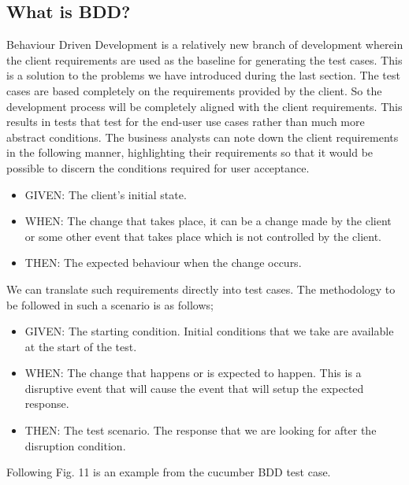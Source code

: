 \documentclass[conference, onecolumn, a4, 12pt]{IEEEtran}
\begin{document}
\subsection{What is BDD?}
Behaviour Driven Development is a relatively new branch of development wherein the client requirements are used as the baseline for generating the test cases. This is a solution to the problems we have introduced during the last section. The test cases are based completely on the requirements provided by the client. So the development process will be completely aligned with the client requirements. This results in tests that test for the end-user use cases rather than much more abstract conditions.\newline
The business analysts can note down the client requirements in the following manner, highlighting their requirements so that it would be possible to discern the conditions required for user acceptance.
\begin{itemize}
	\item GIVEN: The client's initial state.
	\item WHEN: The change that takes place, it can be a change made by the client or some other event that takes place which is not controlled by the client.
	\item THEN: The expected behaviour when the change occurs.
\end{itemize}
We can translate such requirements directly into test cases. The methodology to be followed in such a scenario is as follows;
\begin{itemize}
	\item GIVEN: The starting condition. Initial conditions that we take are available at the start of the test.
	\item WHEN: The change that happens or is expected to happen. This is a disruptive event that will cause the event that will setup the expected response.
	\item THEN: The test scenario. The response that we are looking for after the disruption condition.
\end{itemize}

Following Fig. 11 is an example from the cucumber BDD test case.
\end{document}
